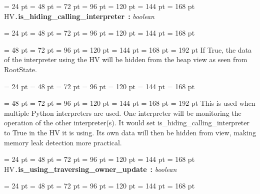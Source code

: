 {{{{\par}
\par}
\par}
{\par \noindent  \leftskip = 24 pt  \leftmargini = 48 pt  \leftmarginii = 72 pt  \leftmarginiii = 96 pt  \leftmarginiv = 120 pt  \leftmarginv = 144 pt  \leftmarginvi = 168 pt HV{\tt .\/}{\bf {\large {\bf is{\_}hiding{\_}calling{\_}interpreter\/}}\/}~{\bf :}  {\em boolean\/}\par}
{\par \noindent  \leftskip = 24 pt  \leftmargini = 48 pt  \leftmarginii = 72 pt  \leftmarginiii = 96 pt  \leftmarginiv = 120 pt  \leftmarginv = 144 pt  \leftmarginvi = 168 pt {\par \noindent
{\par \noindent  \leftskip = 48 pt  \leftmargini = 72 pt  \leftmarginii = 96 pt  \leftmarginiii = 120 pt  \leftmarginiv = 144 pt  \leftmarginv = 168 pt  \leftmarginvi = 192 pt 
If True, the data of the interpreter using the HV will be hidden from
the heap view as seen from RootState.\par}
\par}
\par}
{\par \noindent  \leftskip = 24 pt  \leftmargini = 48 pt  \leftmarginii = 72 pt  \leftmarginiii = 96 pt  \leftmarginiv = 120 pt  \leftmarginv = 144 pt  \leftmarginvi = 168 pt {\par \noindent
{\par \noindent  \leftskip = 48 pt  \leftmargini = 72 pt  \leftmarginii = 96 pt  \leftmarginiii = 120 pt  \leftmarginiv = 144 pt  \leftmarginv = 168 pt  \leftmarginvi = 192 pt This is used when multiple Python interpreters are used. One
interpreter will be monitoring the operation of the other
interpreter(s). It would set is{\_}hiding{\_}calling{\_}interpreter to True in
the HV it is using. Its own data will then be hidden from view, making
memory leak detection more practical.
\par}
\par}
\par}
{\par \noindent  \leftskip = 24 pt  \leftmargini = 48 pt  \leftmarginii = 72 pt  \leftmarginiii = 96 pt  \leftmarginiv = 120 pt  \leftmarginv = 144 pt  \leftmarginvi = 168 pt HV{\tt .\/}{\bf {\large {\bf is{\_}using{\_}traversing{\_}owner{\_}update\/}}\/}~{\bf :}  {\em boolean\/}\par}
{\par \noindent  \leftskip = 24 pt  \leftmargini = 48 pt  \leftmarginii = 72 pt  \leftmarginiii = 96 pt  \leftmarginiv = 120 pt  \leftmarginv = 144 pt  \leftmarginvi = 168 pt {\par \noindent
}}}
